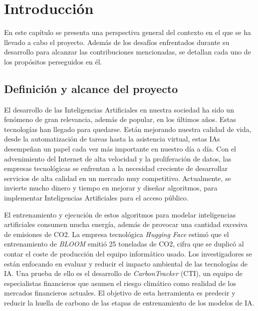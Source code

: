\chapter{Introducción}

En este capítulo se presenta una perspectiva general del contexto en el que se ha llevado a cabo el proyecto. Además de los desafíos enfrentados durante su desarrollo para alcanzar las contribuciones mencionadas, se detallan cada uno de los propósitos perseguidos en él.


\section{Definición y alcance del proyecto}

	El desarrollo de las Inteligencias Artificiales en nuestra sociedad ha sido un fenómeno de gran relevancia, además de popular, en los últimos años. Estas tecnologías han llegado para quedarse. Están mejorando nuestra calidad de vida, desde la automatización de tareas hasta la asistencia virtual\cite{lugano2017virtual}, estas IAs desempeñan un papel cada vez más importante en nuestro día a día.
	Con el advenimiento del Internet de alta velocidad y la proliferación de datos, las empresas tecnológicas se enfrentan a la necesidad creciente de desarrollar servicios de alta calidad en un mercado muy competitivo. Actualmente, se invierte mucho dinero y tiempo en mejorar y diseñar algoritmos, para implementar Inteligencias Artificiales para el acceso público\cite{thomas2021global}.
	
	El entrenamiento y ejecución de estos algoritmos para modelar inteligencias artificiales consumen mucha energía, además de provocar una cantidad excesiva de emisiones de CO2. La empresa tecnológica \textit{Hugging Face} estimó que el entrenamiento de \textit{BLOOM}\cite{BloomAI} emitió 25 toneladas de CO2, cifra que se duplicó al contar el coste de producción del equipo informático usado\cite{kirkpatrick2023carbon}. Los investigadores se están enfocando en evaluar y reducir el impacto ambiental de las tecnologías de IA. Una prueba de ello es el desarrollo de \textit{CarbonTracker}\cite{jeppesen2021carbon} (CTI), un equipo de especialistas financieros que asumen el riesgo climático como realidad de los mercados financieros actuales. El objetivo de esta herramienta es predecir y reducir la huella de carbono de las etapas de entrenamiento de los modelos de IA\cite{mor2021artificial}.
	
